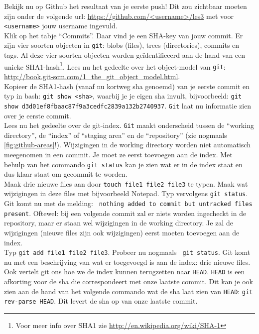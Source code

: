 \step Bekijk nu op Github het resultaat van je eerste push! Dit zou
zichtbaar moeten zijn onder de volgende url:
\url{https://github.com/<username>/les3} met voor {\tt <username>}
jouw username ingevuld. \\

\step Klik op het tabje ``Commits''. Daar vind je een SHA-key van jouw
commit. Er zijn vier soorten objecten in {\tt git}: blobs (files), trees
(directories), commits en tags. Al deze vier soorten objecten worden
geïdentificeerd aan de hand van een unieke SHA1-hash\footnote{Voor meer info
  over SHA1 zie \url{http://en.wikipedia.org/wiki/SHA-1}}. Lees nu het
gedeelte over het object-model van {\tt git}:
\url{http://book.git-scm.com/1_the_git_object_model.html}. \\

\step Kopieer de SHA1-hash (vanaf nu kortweg sha genoemd) van je
eerste commit en typ in bash: {\tt git show <sha>}, waarbij je je
eigen sha invult, bijvoorbeeld: {\tt git show
  d3d01ef8fbaac87f9a3cedfc2839a132b2740937}. {\tt Git} laat nu informatie
zien over je eerste commit. \\

\step Lees nu het gedeelte over de git-index. {\tt Git} maakt onderscheid
tussen de ``working directory'', de ``index'' of ``staging area'' en
de ``repository'' (zie nogmaals \ref{fig:github-areas}!). Wijzigingen
in de working directory worden niet automatisch meegenomen in een
commit. Je moet ze eerst toevoegen aan de index. Met behulp van het
commando {\tt git status} kan je zien wat er in de index staat en dus
klaar staat om gecommit te worden. \\

\step Maak drie nieuwe files aan door {\tt touch file1 file2 file3} te
typen. Maak wat wijzigingen in deze files met bijvoorbeeld Notepad.
Typ vervolgens {\tt git status}. Git komt nu met de melding: {\tt
  nothing added to commit but untracked files present}. Oftewel: bij
een volgende commit zal er niets worden ingecheckt in de repository,
maar er staan wel wijzigingen in de working directory.
Je zal de wijzigingen (nieuwe files zijn ook wijzigingen) eerst moeten
toevoegen aan de index. \\

\step Typ {\tt git add file1 file2 file3}. Probeer nu nogmaals {\tt
  git status}. Git komt nu met een beschrijving van wat er toegevoegd
is aan de index: drie nieuwe files. Ook vertelt git ons hoe we de
index kunnen terugzetten naar {\tt HEAD}. {\tt HEAD} is een afkorting
voor de sha die
correspondeert met onze laatste commit. Dit kan je ook zien aan de
hand van het volgende commando wat de sha laat zien van {\tt HEAD}:
{\tt git rev-parse HEAD}. Dit levert de sha op van onze laatste
commit. \\

